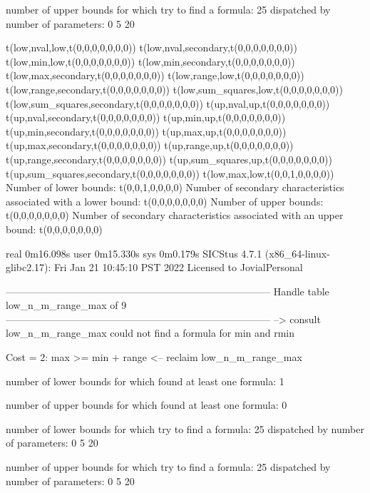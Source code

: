 number of upper bounds for which try to find a formula: 25
dispatched by number of parameters: 0  5  20

t(low,nval,low,t(0,0,0,0,0,0,0))
t(low,nval,secondary,t(0,0,0,0,0,0,0))
t(low,min,low,t(0,0,0,0,0,0,0))
t(low,min,secondary,t(0,0,0,0,0,0,0))
t(low,max,secondary,t(0,0,0,0,0,0,0))
t(low,range,low,t(0,0,0,0,0,0,0))
t(low,range,secondary,t(0,0,0,0,0,0,0))
t(low,sum_squares,low,t(0,0,0,0,0,0,0))
t(low,sum_squares,secondary,t(0,0,0,0,0,0,0))
t(up,nval,up,t(0,0,0,0,0,0,0))
t(up,nval,secondary,t(0,0,0,0,0,0,0))
t(up,min,up,t(0,0,0,0,0,0,0))
t(up,min,secondary,t(0,0,0,0,0,0,0))
t(up,max,up,t(0,0,0,0,0,0,0))
t(up,max,secondary,t(0,0,0,0,0,0,0))
t(up,range,up,t(0,0,0,0,0,0,0))
t(up,range,secondary,t(0,0,0,0,0,0,0))
t(up,sum_squares,up,t(0,0,0,0,0,0,0))
t(up,sum_squares,secondary,t(0,0,0,0,0,0,0))
t(low,max,low,t(0,0,1,0,0,0,0))
Number of lower bounds:                                             t(0,0,1,0,0,0,0)
Number of secondary characteristics associated with a lower bound:  t(0,0,0,0,0,0,0)
Number of upper bounds:                                             t(0,0,0,0,0,0,0)
Number of secondary characteristics associated with an upper bound: t(0,0,0,0,0,0,0)

real	0m16.098s
user	0m15.330s
sys	0m0.179s
SICStus 4.7.1 (x86_64-linux-glibc2.17): Fri Jan 21 10:45:10 PST 2022
Licensed to JovialPersonal


--------------------------------------------------------------------------------
Handle table low_n_m_range_max of 9
--------------------------------------------------------------------------------
--> consult low_n_m_range_max
could not find a formula for min and rmin

Cost =  2:  max >= min + range
<-- reclaim low_n_m_range_max

number of lower bounds for which found at least one formula: 1

number of upper bounds for which found at least one formula: 0

number of lower bounds for which try to find a formula: 25
dispatched by number of parameters: 0  5  20

number of upper bounds for which try to find a formula: 25
dispatched by number of parameters: 0  5  20

